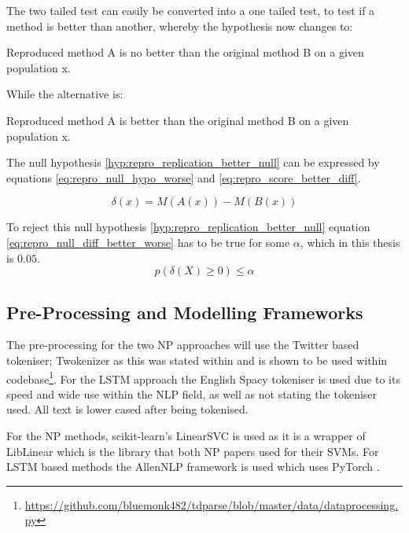 The two tailed test can easily be converted into a one tailed test, to test if a method is better than another, whereby the hypothesis now changes to:
\begin{hyp}
Reproduced method A is no better than the original method B on a given population x. 
\label{hyp:repro_replication_better_null}
\end{hyp}
While the alternative is:
\begin{hyp}
Reproduced method A is better than the original method B on a given population x. 
\label{hyp:repro_replication_better_alt}
\end{hyp}

The null hypothesis \ref{hyp:repro_replication_better_null} can be expressed by equations \ref{eq:repro_null_hypo_worse} and \ref{eq:repro_score_better_diff}.  

\begin{equation}
 \delta(x) = M(A(x)) - M(B(x))
\label{eq:repro_score_better_diff}
\end{equation}

To reject this null hypothesis \ref{hyp:repro_replication_better_null} equation \ref{eq:repro_null_diff_better_worse} has to be true for some $\alpha$, which in this thesis is $0.05$. 
\begin{equation}
    p(\delta(X) \geq 0) \le \alpha
\label{eq:repro_null_diff_better_worse}
\end{equation}

\FloatBarrier
\subsection{Pre-Processing and Modelling Frameworks}
The pre-processing for the two NP approaches will use the Twitter based tokeniser; Twokenizer \citep{gimpel-etal-2011-part} as this was stated within \citet{vo2015target} and is shown to be used within \citet{wang-etal-2017-tdparse} codebase\footnote{\url{https://github.com/bluemonk482/tdparse/blob/master/data/dataprocessing.py}}. For the LSTM approach \citep{tang-etal-2016-effective} the English Spacy tokeniser is used due to its speed and wide use within the NLP field, as well as \citet{tang-etal-2016-effective} not stating the tokeniser used. All text is lower cased after being tokenised.

For the NP methods, scikit-learn's \citep{pedregosa2011scikit} LinearSVC is used as it is a wrapper of LibLinear \citep{fan2008liblinear} which is the library that both NP papers used for their SVMs. For \citet{tang-etal-2016-effective} LSTM based methods the AllenNLP framework \citep{gardner-etal-2018-allennlp} is used which uses PyTorch \citep{NEURIPS2019_9015}. 

